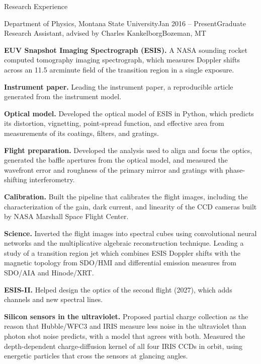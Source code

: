 \documentclass{resume}
\begin{document}
\begin{rSection}{Research Experience}

	\begin{rSubsection}{Department of Physics, Montana State University}{Jan 2016 -- Present}{Graduate Research Assistant, advised by Charles Kankelborg}{Bozeman, MT}
		\small
		\item \textbf{EUV Snapshot Imaging Spectrograph (ESIS).}
		A NASA sounding rocket computed tomography imaging spectrograph, which measures Doppler shifts across an 11.5 arcminute field of the transition region in a single exposure.
		\begin{details}
			\item \textbf{Instrument paper.} Leading the instrument paper, a reproducible article generated from the instrument model.
			\item \textbf{Optical model.} Developed the optical model of ESIS in Python, which predicts its distortion, vignetting, point-spread function, and effective area from measurements of its coatings, filters, and gratings.
			\item \textbf{Flight preparation.} Developed the analysis used to align and focus the optics, generated the baffle apertures from the optical model, and measured the wavefront error and roughness of the primary mirror and gratings with phase-shifting interferometry.
			\item \textbf{Calibration.} Built the pipeline that calibrates the flight images, including the characterization of the gain, dark current, and linearity of the CCD cameras built by NASA Marshall Space Flight Center.
			\item \textbf{Science.} Inverted the flight images into spectral cubes using convolutional neural networks and the multiplicative algebraic reconstruction technique. Leading a study of a transition region jet which combines ESIS Doppler shifts with the magnetic topology from SDO/HMI and differential emission measures from SDO/AIA and Hinode/XRT.
			\item \textbf{ESIS-II.} Helped design the optics of the second flight (2027), which adds channels and new spectral lines.
		\end{details}
		\item \textbf{Silicon sensors in the ultraviolet.}
		Proposed partial charge collection as the reason that Hubble/WFC3 and IRIS measure less noise in the ultraviolet than photon shot noise predicts, with a model that agrees with both.
		Measured the depth-dependent charge-diffusion kernel of all four IRIS CCDs in orbit, using energetic particles that cross the sensors at glancing angles.

\end{rSubsection}
\end{rSection}
\end{document}
